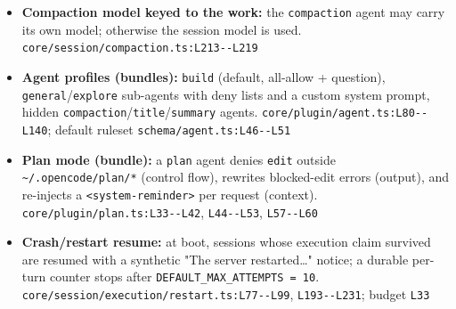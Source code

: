 \begin{itemize}
\item \textbf{Compaction model keyed to the work:} the \texttt{compaction} agent may carry its own model; otherwise the session model is used. \texttt{core/\allowbreak{}session/\allowbreak{}compaction.\allowbreak{}ts:\allowbreak{}L213-\allowbreak{}-\allowbreak{}L219}
\item \textbf{Agent profiles (bundles):} \texttt{build} (default, all-allow + question), \texttt{general}/\texttt{explore} sub-agents with deny lists and a custom system prompt, hidden \texttt{compaction}/\texttt{title}/\texttt{summary} agents. \texttt{core/\allowbreak{}plugin/\allowbreak{}agent.\allowbreak{}ts:\allowbreak{}L80-\allowbreak{}-\allowbreak{}L140}; default ruleset \texttt{schema/\allowbreak{}agent.\allowbreak{}ts:\allowbreak{}L46-\allowbreak{}-\allowbreak{}L51}
\item \textbf{Plan mode (bundle):} a \texttt{plan} agent denies \texttt{edit} outside \texttt{\textasciitilde{}/\allowbreak{}.\allowbreak{}opencode/\allowbreak{}plan/\allowbreak{}*} (control flow), rewrites blocked-edit errors (output), and re-injects a \texttt{<system-\allowbreak{}reminder>} per request (context). \texttt{core/\allowbreak{}plugin/\allowbreak{}plan.\allowbreak{}ts:\allowbreak{}L33-\allowbreak{}-\allowbreak{}L42}, \texttt{L44-\allowbreak{}-\allowbreak{}L53}, \texttt{L57-\allowbreak{}-\allowbreak{}L60}
\item \textbf{Crash/restart resume:} at boot, sessions whose execution claim survived are resumed with a synthetic "The server restarted\ldots{}" notice; a durable per-turn counter stops after \texttt{DEFAULT\_\allowbreak{}MAX\_\allowbreak{}ATTEMPTS = 10}. \texttt{core/\allowbreak{}session/\allowbreak{}execution/\allowbreak{}restart.\allowbreak{}ts:\allowbreak{}L77-\allowbreak{}-\allowbreak{}L99}, \texttt{L193-\allowbreak{}-\allowbreak{}L231}; budget \texttt{L33}
\end{itemize}

